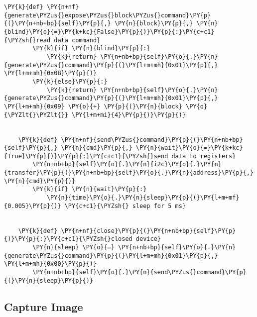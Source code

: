 \begin{tcolorbox}[breakable, size=fbox, boxrule=1pt, pad at break*=1mm,colback=cellbackground, colframe=cellborder]
\begin{Verbatim}[commandchars=\\\{\}]
	\PY{k}{def} \PY{n+nf}{generate\PYZus{}expose\PYZus{}block\PYZus{}command}\PY{p}{(}\PY{n+nb+bp}{self}\PY{p}{,} \PY{n}{block}\PY{p}{,} \PY{n}{blind}\PY{o}{=}\PY{k+kc}{False}\PY{p}{)}\PY{p}{:}\PY{c+c1}{\PYZsh{}read data command}
		\PY{k}{if} \PY{n}{blind}\PY{p}{:}
			\PY{k}{return} \PY{n+nb+bp}{self}\PY{o}{.}\PY{n}{generate\PYZus{}command}\PY{p}{(}\PY{l+m+mh}{0x01}\PY{p}{,} \PY{l+m+mh}{0x0B}\PY{p}{)}
		\PY{k}{else}\PY{p}{:}
			\PY{k}{return} \PY{n+nb+bp}{self}\PY{o}{.}\PY{n}{generate\PYZus{}command}\PY{p}{(}\PY{l+m+mh}{0x01}\PY{p}{,} \PY{l+m+mh}{0x09} \PY{o}{+} \PY{p}{(}\PY{n}{block} \PY{o}{\PYZlt{}\PYZlt{}} \PY{l+m+mi}{4}\PY{p}{)}\PY{p}{)}


	\PY{k}{def} \PY{n+nf}{send\PYZus{}command}\PY{p}{(}\PY{n+nb+bp}{self}\PY{p}{,} \PY{n}{cmd}\PY{p}{,} \PY{n}{wait}\PY{o}{=}\PY{k+kc}{True}\PY{p}{)}\PY{p}{:}\PY{c+c1}{\PYZsh{}send data to registers}
		\PY{n+nb+bp}{self}\PY{o}{.}\PY{n}{i2c}\PY{o}{.}\PY{n}{transfer}\PY{p}{(}\PY{n+nb+bp}{self}\PY{o}{.}\PY{n}{address}\PY{p}{,} \PY{n}{cmd}\PY{p}{)}
		\PY{k}{if} \PY{n}{wait}\PY{p}{:}
			\PY{n}{time}\PY{o}{.}\PY{n}{sleep}\PY{p}{(}\PY{l+m+mf}{0.005}\PY{p}{)} \PY{c+c1}{\PYZsh{} sleep for 5 ms}


	\PY{k}{def} \PY{n+nf}{close}\PY{p}{(}\PY{n+nb+bp}{self}\PY{p}{)}\PY{p}{:}\PY{c+c1}{\PYZsh{}closed device}
		\PY{n}{sleep} \PY{o}{=} \PY{n+nb+bp}{self}\PY{o}{.}\PY{n}{generate\PYZus{}command}\PY{p}{(}\PY{l+m+mh}{0x01}\PY{p}{,} \PY{l+m+mh}{0x00}\PY{p}{)}
		\PY{n+nb+bp}{self}\PY{o}{.}\PY{n}{send\PYZus{}command}\PY{p}{(}\PY{n}{sleep}\PY{p}{)}
\end{Verbatim}
\end{tcolorbox}

 \subsection{Capture Image}

